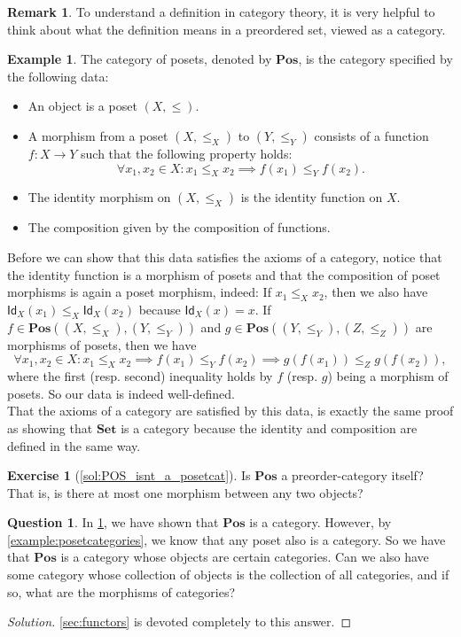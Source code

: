 \documentclass[a4paper,10pt]{scrartcl}
\theoremstyle{plain}
\theoremstyle{definition}
\newtheorem{rem}[thm]{Remark}
\newtheorem{que}[thm]{Question}
\newtheorem{exa}[thm]{Example}
\newtheorem{exer}[thm]{Exercise}
\newcommand{\cfont}[1]{\ensuremath{\mathsf{#1}}}
\newcommand{\Catb}[1]{\mathbf{#1}}
\newcommand{\SET}{\Catb{Set}}
\newcommand{\POS}{\Catb{Pos}}
\newcommand{\CHom}[3]{{#1}(#2,#3)}
\newcommand{\Id}[1][]{\cfont{Id}_{#1}}
\begin{document}
\begin{rem}
  To understand a definition in category theory, it is very helpful to think about what the definition means in a preordered set, viewed as a category. 
\end{rem}

\begin{exa}\label{example:poset} The category of posets, denoted by $\POS$, is the category specified by the following data:
\begin{itemize}
\item An object is a poset $(X,\leq)$.
\item A morphism from a poset $(X,\leq_X)$ to $(Y,\leq_Y)$ consists of a function $f:X\to Y$ such that the following property holds:
\[
\forall x_1, x_2 \in X: x_1\leq_X x_2 \implies f(x_1)\leq_Y f(x_2).
\]
\item The identity morphism on $(X,\leq_X)$ is the identity function on $X$.
\item The composition given by the composition of functions.
\end{itemize}

Before we can show that this data satisfies the axioms of a category, notice that the identity function is a morphism of posets and that the composition of poset morphisms is again a poset morphism, indeed: If $x_1\leq_X x_2$, then we also have $\Id[X](x_1) \leq_X \Id[X](x_2)$ because $\Id[X](x) = x$. If $f\in\CHom{\POS}{(X,\leq_X)}{(Y,\leq_Y)}$ and $g\in\CHom{\POS}{(Y,\leq_Y)} {(Z,\leq_Z)}$ are morphisms of posets, then we have 
\[
\forall x_1,x_2\in X: x_1\leq_X x_2 \implies f(x_1)\leq_Y f(x_2) \implies g(f(x_1))\leq_Z g(f(x_2)),
\]
where the first (resp. second) inequality holds by $f$ (resp. $g$) being a morphism of posets. So our data is indeed well-defined.\\
That the axioms of a category are satisfied by this data, is exactly the same proof as showing that $\SET$ is a category because the identity and composition are defined in the same way.
\end{exa}

\begin{exer}[\cref{sol:POS_isnt_a_posetcat}]\label{exer:POS_isnt_a_posetcat}
  Is $\POS$ a preorder-category itself? That is, is there at most one morphism between any two objects?
\end{exer}

\begin{que}\label{que:posetcatstoallcats} In \cref{example:poset}, we have shown that $\POS$ is a category. However, by \cref{example:posetcategories}, we know that any poset also is a category. So we have that $\POS$ is a category whose objects are certain categories. Can we also have some category whose collection of objects is the collection of all categories, and if so, what are the morphisms of categories? 
\begin{proof}[Solution]
\cref{sec:functors} is devoted completely to this answer.
\end{proof}
\end{que}
\end{document}
